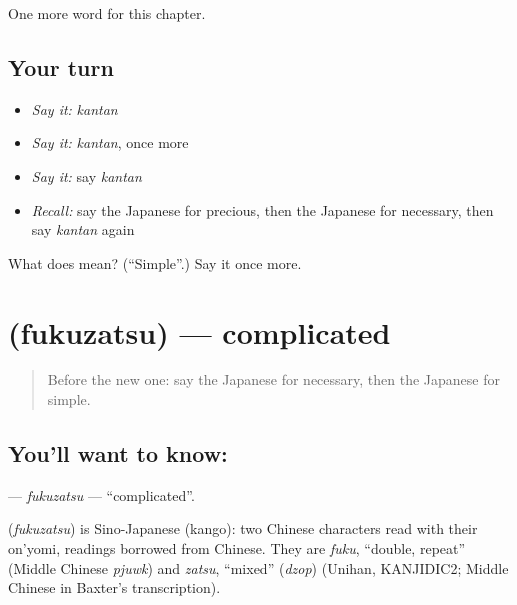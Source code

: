 \begin{grammarlens}[title={What you've built}]
One more word for this chapter.
\end{grammarlens}

\subsection*{Your turn}
\begin{itemize}
\raggedright
  \item \emph{Say it:} \emph{kantan}
  \item \emph{Say it:} \emph{kantan}, once more
  \item \emph{Say it:} say \emph{kantan}
  \item \emph{Recall:} say the Japanese for precious, then the Japanese for necessary, then say \emph{kantan} again
\end{itemize}

\begin{tcolorbox}[breakable,colback=teal!4,colframe=teal!35!black,title={Before you move on}]
What does  mean? (\textquotedblleft{}Simple\textquotedblright{}.) Say it once more.
\end{tcolorbox}
\section[\texorpdfstring{\ja{ふくざつ} (fukuzatsu)}{ふくざつ (fukuzatsu)}]{ (fukuzatsu) — complicated}

\label{lesson:JA-C122-fukuzatsu}



\begin{quote}
Before the new one: say the Japanese for necessary, then the Japanese for simple.
\end{quote}

\subsection*{You'll want to know: }
\textbf{} — \emph{fukuzatsu} — \textquotedblleft{}complicated\textquotedblright{}.

\begin{cousinweb}
\textbf{} (\emph{fukuzatsu}) is Sino-Japanese (kango): two Chinese characters read with their on'yomi, readings borrowed from Chinese. They are \emph{fuku}, \textquotedblleft{}double, repeat\textquotedblright{} (Middle Chinese \emph{pjuwk}) and \emph{zatsu}, \textquotedblleft{}mixed\textquotedblright{} (\emph{dzop}) (Unihan, KANJIDIC2; Middle Chinese in Baxter's transcription).
\end{cousinweb}

